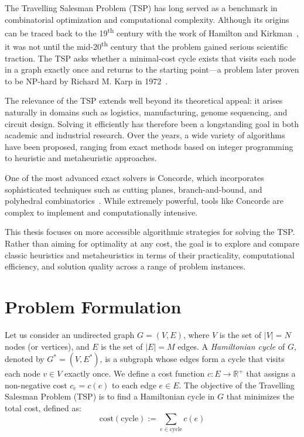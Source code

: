 The Travelling Salesman Problem (TSP) has long served as a benchmark in combinatorial optimization and computational complexity. Although its origins can be traced back to the 19\textsuperscript{th} century with the work of Hamilton and Kirkman~\cite{Biggs1986Graph}, it was not until the mid-20\textsuperscript{th} century that the problem gained serious scientific traction. The TSP asks whether a minimal-cost cycle exists that visits each node in a graph exactly once and returns to the starting point—a problem later proven to be NP-hard by Richard M. Karp in 1972~\cite{Karp1972}.

The relevance of the TSP extends well beyond its theoretical appeal: it arises naturally in domains such as logistics, manufacturing, genome sequencing, and circuit design. Solving it efficiently has therefore been a longstanding goal in both academic and industrial research. Over the years, a wide variety of algorithms have been proposed, ranging from exact methods based on integer programming to heuristic and metaheuristic approaches.

One of the most advanced exact solvers is Concorde, which incorporates sophisticated techniques such as cutting planes, branch-and-bound, and polyhedral combinatorics~\cite{Applegate2006}. While extremely powerful, tools like Concorde are complex to implement and computationally intensive.

This thesis focuses on more accessible algorithmic strategies for solving the TSP. Rather than aiming for optimality at any cost, the goal is to explore and compare classic heuristics and metaheuristics in terms of their practicality, computational efficiency, and solution quality across a range of problem instances.


\section{Problem Formulation}

Let us consider an undirected graph $G = (V, E)$, where $V$ is the set of $|V| = N$ nodes (or vertices), 
and $E$ is the set of $|E| = M$ edges. A \textit{Hamiltonian cycle} of $G$, denoted by $G^* = (V, E^*)$, 
is a subgraph whose edges form a cycle that visits each node $v \in V$ exactly once.
We define a cost function $c : E \rightarrow \mathbb{R}^+$ that assigns a non-negative cost $c_e = c(e)$ to each edge $e \in E$. 
The objective of the Travelling Salesman Problem (TSP) is to find a Hamiltonian cycle in $G$ that minimizes the total cost, defined as:
\[
\text{cost}(\text{cycle}) := \sum_{e \in \text{cycle}} c(e)
\]

